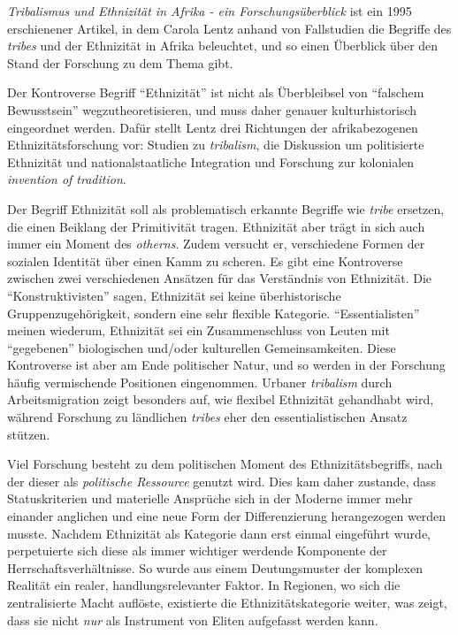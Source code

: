 \documentclass[a4paper, 12pt]{article}
\begin{document}
\begin{onehalfspace} 





\noindent 
\emph{Tribalismus und Ethnizität in Afrika - ein Forschungsüberblick} ist ein 1995 erschienener Artikel, in dem Carola Lentz anhand von Fallstudien die Begriffe des \emph{tribes} und der Ethnizität in Afrika beleuchtet, und so einen Überblick über den Stand der Forschung zu dem Thema gibt.

Der Kontroverse Begriff "`Ethnizität"' ist nicht als Überbleibsel von "`falschem Bewusstsein"' wegzutheoretisieren, und muss daher genauer kulturhistorisch eingeordnet werden. Dafür stellt Lentz drei Richtungen der afrikabezogenen Ethnizitätsforschung vor: Studien zu \emph{tribalism}, die Diskussion um politisierte Ethnizität und nationalstaatliche Integration und Forschung zur kolonialen \emph{invention of tradition}. 

Der Begriff Ethnizität soll als problematisch erkannte Begriffe wie \emph{tribe} ersetzen, die einen Beiklang der Primitivität tragen. Ethnizität aber trägt in sich auch immer ein Moment des \emph{otherns}. Zudem versucht er, verschiedene Formen der sozialen Identität über einen Kamm zu scheren. Es gibt eine Kontroverse zwischen zwei verschiedenen Ansätzen für das Verständnis von Ethnizität. Die "`Konstruktivisten"' sagen, Ethnizität sei keine überhistorische Gruppenzugehörigkeit, sondern eine sehr flexible Kategorie. "`Essentialisten"' meinen wiederum, Ethnizität sei ein Zusammenschluss von Leuten mit "`gegebenen"' biologischen und/oder kulturellen Gemeinsamkeiten. Diese Kontroverse ist aber am Ende politischer Natur, und so werden in der Forschung häufig vermischende Positionen eingenommen. Urbaner \emph{tribalism} durch Arbeitsmigration zeigt besonders auf, wie flexibel Ethnizität gehandhabt wird, während Forschung zu ländlichen \emph{tribes} eher den essentialistischen Ansatz stützen.

Viel Forschung besteht zu dem politischen Moment des Ethnizitätsbegriffs, nach der dieser als \emph{politische Ressource} genutzt wird. Dies kam daher zustande, dass Statuskriterien und materielle Ansprüche sich in der Moderne immer mehr einander anglichen und eine neue Form der Differenzierung herangezogen werden musste. Nachdem Ethnizität als Kategorie dann erst einmal eingeführt wurde, perpetuierte sich diese als immer wichtiger werdende Komponente der Herrschaftsverhältnisse. So wurde aus einem Deutungsmuster der komplexen Realität ein realer, handlungsrelevanter Faktor. In Regionen, wo sich die zentralisierte Macht auflöste, existierte die Ethnizitätskategorie weiter, was zeigt, dass sie nicht \emph{nur} als Instrument von Eliten aufgefasst werden kann.


\end{onehalfspace}
\end{document}
